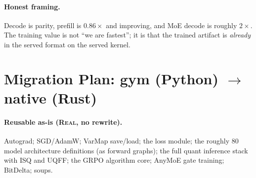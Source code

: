 \documentclass[11pt]{article}
\begin{document}
\paragraph{Honest framing.} Decode is parity, prefill is $0.86\times$ and improving, and MoE decode is roughly $2\times$. The training value is not ``we are fastest''; it is that the trained artifact is \emph{already} in the served format on the served kernel.

\section{Migration Plan: gym (Python) $\to$ native (Rust)}
\label{sec:migration}

\paragraph{Reusable as-is (\textsc{Real}, no rewrite).} Autograd; SGD/AdamW; VarMap save/load; the loss module; the roughly $80$ model architecture definitions (as forward graphs); the full quant inference stack with ISQ and UQFF; the GRPO algorithm core; AnyMoE gate training; BitDelta; soups.
\end{document}
